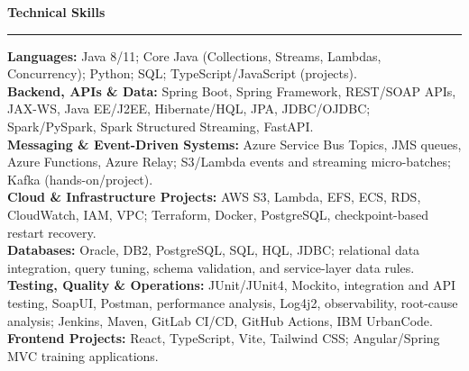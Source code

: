 \documentclass[11pt,letterpaper]{article}
\newcommand{\ressection}[1]{\Needspace{6\baselineskip}\vspace{8pt}\par\textbf{#1}\par\vspace{2pt}\hrule\vspace{5pt}}
\begin{document}
\ressection{Technical Skills}
\textbf{Languages:} Java 8/11; Core Java (Collections, Streams, Lambdas, Concurrency); Python; SQL; TypeScript/JavaScript (projects).\\
\textbf{Backend, APIs \& Data:} Spring Boot, Spring Framework, REST/SOAP APIs, JAX-WS, Java EE/J2EE, Hibernate/HQL, JPA, JDBC/OJDBC; Spark/PySpark, Spark Structured Streaming, FastAPI.\\
\textbf{Messaging \& Event-Driven Systems:} Azure Service Bus Topics, JMS queues, Azure Functions, Azure Relay; S3/Lambda events and streaming micro-batches; Kafka (hands-on/project).\\
\textbf{Cloud \& Infrastructure Projects:} AWS S3, Lambda, EFS, ECS, RDS, CloudWatch, IAM, VPC; Terraform, Docker, PostgreSQL, checkpoint-based restart recovery.\\
\textbf{Databases:} Oracle, DB2, PostgreSQL, SQL, HQL, JDBC; relational data integration, query tuning, schema validation, and service-layer data rules.\\
\textbf{Testing, Quality \& Operations:} JUnit/JUnit4, Mockito, integration and API testing, SoapUI, Postman, performance analysis, Log4j2, observability, root-cause analysis; Jenkins, Maven, GitLab CI/CD, GitHub Actions, IBM UrbanCode.\\
\textbf{Frontend Projects:} React, TypeScript, Vite, Tailwind CSS; Angular/Spring MVC training applications.
\end{document}
